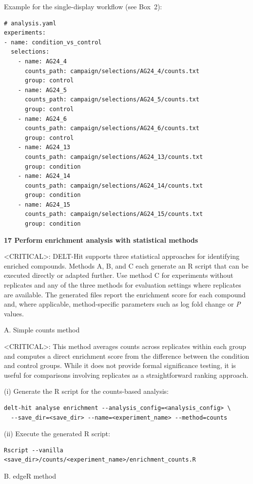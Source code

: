 \documentclass[pdflatex,sn-nature]{sn-jnl}
\newcommand{\protocolstep}[2]{\par\medskip\noindent\textbf{#1 \textbar{} #2}\par}
\begin{document}
Example for the single-display workflow (see Box~2):

\begin{lstlisting}
# analysis.yaml
experiments:
- name: condition_vs_control
  selections:
    - name: AG24_4
      counts_path: campaign/selections/AG24_4/counts.txt
      group: control
    - name: AG24_5
      counts_path: campaign/selections/AG24_5/counts.txt
      group: control
    - name: AG24_6
      counts_path: campaign/selections/AG24_6/counts.txt
      group: control
    - name: AG24_13
      counts_path: campaign/selections/AG24_13/counts.txt
      group: condition
    - name: AG24_14
      counts_path: campaign/selections/AG24_14/counts.txt
      group: condition
    - name: AG24_15
      counts_path: campaign/selections/AG24_15/counts.txt
      group: condition
\end{lstlisting}

\protocolstep{17}{Perform enrichment analysis with statistical methods}
<CRITICAL>: DELT-Hit supports three statistical approaches for identifying enriched compounds. Methods A, B, and C each generate an R script that can be executed directly or adapted further. Use method C for experiments without replicates and any of the three methods for evaluation settings where replicates are available. The generated files report the enrichment score for each compound and, where applicable, method-specific parameters such as log fold change or \textit{P} values.

A. Simple counts method

<CRITICAL>: This method averages counts across replicates within each group and computes a direct enrichment score from the difference between the condition and control groups. While it does not provide formal significance testing, it is useful for comparisons involving replicates as a straightforward ranking approach.

(i) Generate the R script for the counts-based analysis:
\begin{lstlisting}
delt-hit analyse enrichment --analysis_config=<analysis_config> \
  --save_dir=<save_dir> --name=<experiment_name> --method=counts
\end{lstlisting}

(ii) Execute the generated R script:
\begin{lstlisting}
Rscript --vanilla <save_dir>/counts/<experiment_name>/enrichment_counts.R
\end{lstlisting}


B. edgeR method
\end{document}
